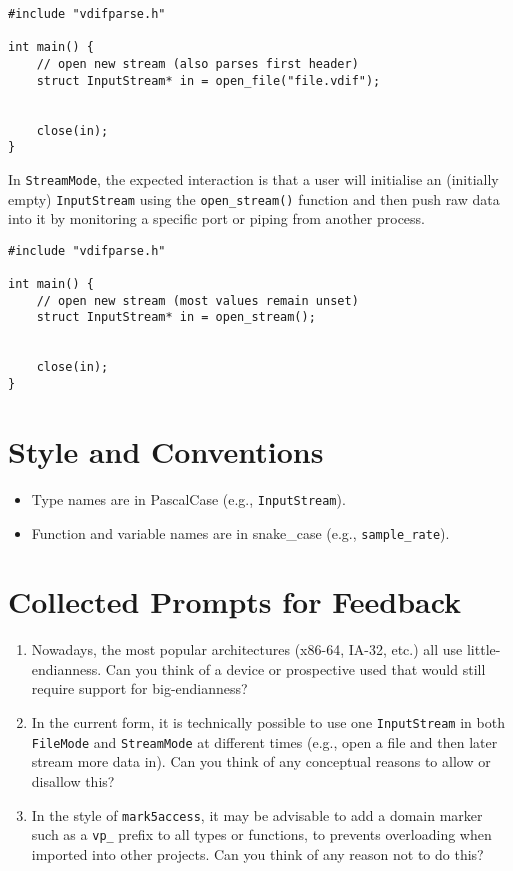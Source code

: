 \documentclass[11pt]{article}
\begin{document}
\begin{lstlisting} 
#include "vdifparse.h"

int main() { 
	// open new stream (also parses first header)
	struct InputStream* in = open_file("file.vdif");
	
	
	close(in);
} 
\end{lstlisting} 

In \lstinline{StreamMode}, the expected interaction is that a user will initialise an (initially empty) \lstinline{InputStream} using the \lstinline{open_stream()} function and then push raw data into it by monitoring a specific port or piping from another process.

\begin{lstlisting} 
#include "vdifparse.h"

int main() { 
	// open new stream (most values remain unset)
	struct InputStream* in = open_stream();
	
	
	close(in);
} 
\end{lstlisting} 

\section{Style and Conventions}

\begin{itemize}
	\item Type names are in PascalCase (e.g., \lstinline{InputStream}).
	\item Function and variable names are in snake\_case (e.g., \lstinline{sample_rate}).
\end{itemize}

\section{Collected Prompts for Feedback}

\begin{enumerate}
	\item Nowadays, the most popular architectures (x86-64, IA-32, etc.) all use little-endianness. Can you think of a device or prospective used that would still require support for big-endianness?
	\item In the current form, it is technically possible to use one \lstinline{InputStream} in both \lstinline{FileMode} and \lstinline{StreamMode} at different times (e.g., open a file and then later stream more data in). Can you think of any conceptual reasons to allow or disallow this?
	\item In the style of \texttt{mark5access}, it may be advisable to add a domain marker such as a \lstinline{vp_} prefix to all types or functions, to prevents overloading when imported into other projects. Can you think of any reason not to do this?
\end{enumerate}

	
\end{document}

